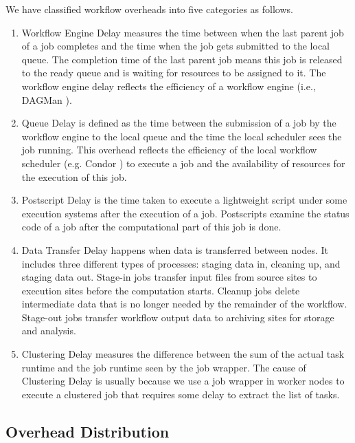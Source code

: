 We have classified workflow overheads into five categories as follows. 
\begin{enumerate}

\item{Workflow Engine Delay} measures the time between when the last parent job of a job completes and the time when the job gets submitted to the local queue. 
The completion time of the last parent job means this job is released to the ready queue and is waiting for resources to be assigned to it. The workflow engine delay reflects the efficiency of a workflow engine (i.e., DAGMan \cite{DAGMan}). 

\item{Queue Delay} is defined as the time between the submission of a job by the workflow engine to the local queue and the time the local scheduler sees the job running. This overhead reflects the efficiency of the local workflow scheduler (e.g. Condor \cite{Frey2002}) to execute a job and the availability of resources for the execution of this job. 

\item{Postscript Delay} is the time taken to execute a lightweight script under some execution systems after the execution of a job. Postscripts examine the status code of a job after the computational part of this job is done.

\item{Data Transfer Delay} happens when data is transferred between nodes. It includes three different types of processes: staging data in, cleaning up, and staging data out. Stage-in jobs transfer input files from source sites to execution sites before the computation starts. Cleanup jobs delete intermediate data that is no longer needed by the remainder of the workflow. Stage-out jobs transfer workflow output data to archiving sites for storage and analysis.

\item{Clustering Delay} measures the difference between the sum of the actual task runtime and the job runtime seen by the job wrapper. The cause of Clustering Delay is usually because we use a job wrapper in worker nodes to execute a clustered job that requires some delay to extract the list of tasks. 
\end{enumerate}

\subsection{Overhead Distribution}

